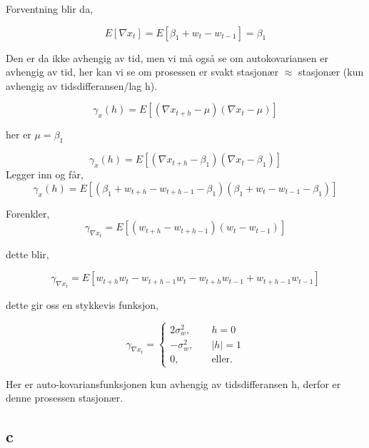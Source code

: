 \documentclass[10pt]{article}
\begin{document}
{Forventning blir da,

\begin{equation*}
  E[\nabla x_{t}] = E[\beta_{1} + w_{t} - w_{t-1}] = \beta_{1}
\end{equation*}

Den er da ikke avhengig av tid, men vi må også se om autokovariansen er avhengig av tid, her kan vi se om prosessen er svakt stasjonær $\approx$ stasjonær (kun avhengig av tidsdifferansen/lag h).


\begin{equation*}
  \gamma_{x}(h) = E[(\nabla x_{t+h} - \mu)(\nabla x_{t} - \mu)]
\end{equation*}

her er $\mu = \beta_{1}$

\begin{equation}
  \gamma_{x}(h) = E[(\nabla x_{t+h} - \beta_{1})(\nabla x_{t} - \beta_{1})]
\end{equation}
Legger inn og får,
\begin{equation}
  \gamma_{x}(h) = E[(\beta_{1} + w_{t+h} - w_{t+h-1} - \beta_{1})(\beta_{1} + w_{t} - w_{t-1} - \beta_{1})]
\end{equation}

Forenkler,
 \begin{equation}
  \gamma_{\nabla x_{t}} = E[(w_{t+h} - w_{t+h-1})(w_{t} - w_{t-1})]
\end{equation}

dette blir,

  \begin{equation}
  \gamma_{\nabla x_{t}} = E[w_{t+h}w_{t} - w_{t+h-1}w_{t} - w_{t+h}w_{t-1} + w_{t+h-1}w_{t-1}]
\end{equation}

dette gir oss en stykkevis funksjon,

\[   
\gamma_{\nabla x_{t}} = 
   \begin{cases}
     2\sigma_{w}^2, &\quad h = 0\\
     -\sigma_{w}^2, &\quad |h| = 1 \\
     \text{0,} &\quad\text{eller.}
   \end{cases}
\]

Her er auto-kovariansfunksjonen kun avhengig av tidsdifferansen h, derfor er denne prosessen stasjonær.



\subsection{c}

}
\end{document}
